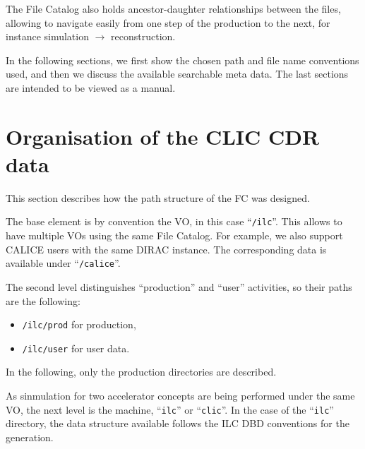 \documentclass[11pt,a4paper]{scrartcl}
\begin{document}
The File Catalog also holds ancestor-daughter relationships between the files,
allowing to navigate easily from one step of the production to the
next, for instance simulation $\to$ reconstruction.

In the following sections, we first show the chosen path and file name
conventions used, and then we discuss the available searchable meta data. The
last sections are intended to be viewed as a manual.

\section{Organisation of the CLIC CDR data}
This section describes how the path structure of the FC was designed. 

The base element is by convention the VO, in this case
``\lstinline[language=bash]|/ilc|''. This allows to have multiple VOs using the
same File Catalog. For example, we also support CALICE users with the same DIRAC
instance. The corresponding data is available under
``\lstinline[language=bash]|/calice|''.

The second level distinguishes ``production'' and ``user'' activities, so their
paths are the following:
\begin{itemize}
  \item \lstinline[language=bash]|/ilc/prod| for production,
  \item \lstinline[language=bash]|/ilc/user| for user data.
\end{itemize} 
In the following, only the production directories are described. 

As sinmulation for two accelerator concepts are being performed under the same
VO, the next level is the machine, ``\lstinline[language=bash]|ilc|'' or
``\lstinline[language=bash]|clic|''. In the case of the
``\lstinline[language=bash]|ilc|'' directory,  the data structure available
follows the ILC DBD conventions for the generation.
\end{document}
